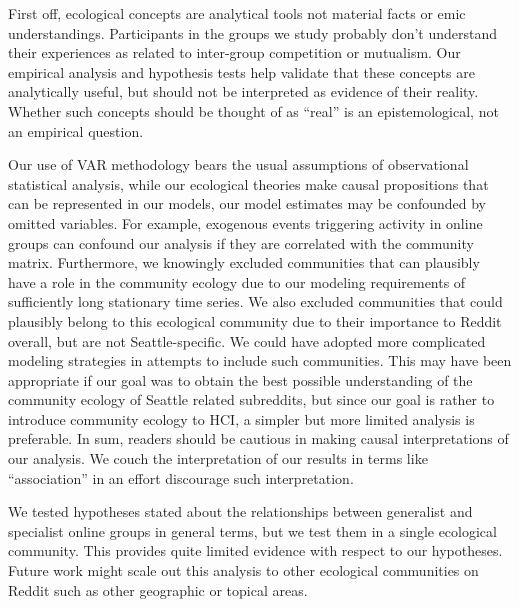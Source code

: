 \documentclass[12pt]{memoir}
\begin{document}
First off, ecological concepts are analytical tools not material facts or emic understandings.  Participants in the groups we study probably don't  understand their experiences as related to inter-group competition or mutualism.  Our empirical analysis and hypothesis tests help validate that these concepts are analytically useful, but should not be interpreted as evidence of their reality.  Whether such concepts should be thought of as ``real'' is an epistemological, not an empirical question.

Our use of VAR methodology bears the usual assumptions of observational statistical analysis, while our ecological theories make causal propositions that can be represented in our models, our model estimates may be confounded by omitted variables.  For example, exogenous events triggering activity in online groups can confound our analysis if they are correlated with the community matrix.  Furthermore, we knowingly excluded communities that can plausibly have a role in the community ecology due to our modeling requirements of sufficiently long stationary time series. We also excluded communities that could plausibly belong to this ecological community due to their importance to Reddit overall, but are not Seattle-specific. We could have adopted more complicated modeling strategies in attempts to include such communities.  This may have been appropriate if our goal was to obtain the best possible understanding of the community ecology of Seattle related subreddits, but since our goal is rather to introduce community ecology to HCI, a simpler but more limited analysis is preferable.  In sum, readers should be cautious in making causal interpretations of our analysis. We couch the interpretation of our results in terms like ``association'' in an effort discourage such interpretation.

We tested hypotheses stated about the relationships between generalist and specialist online groups in general terms, but we test them in a single ecological community.  This provides quite limited evidence with respect to our hypotheses. Future work might scale out this analysis to other ecological communities on Reddit such as other geographic or topical areas.


\setcounter{biburlnumpenalty}{9001}
\printbibliography[title = {References}, heading=secbib]
\end{document}

